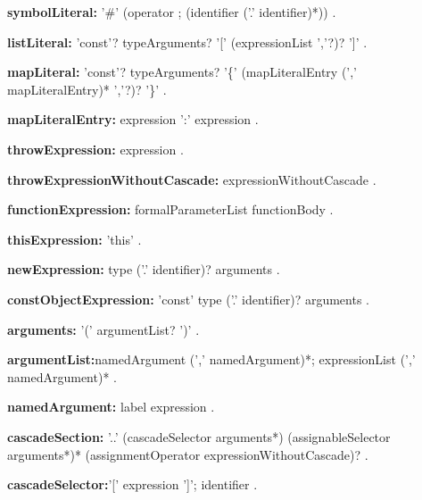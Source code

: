 \begin{grammar}
{\bf symbolLiteral:}
      '\#'  (operator ; (identifier ('.' identifier)*))  .
\end{grammar}
\begin{grammar}
{\bf listLiteral:}
     'const'? typeArguments? '[' (expressionList ','?)? ']'
    .
\end{grammar}
\begin{grammar}
{\bf mapLiteral:}
      'const'?  typeArguments? '\{' (mapLiteralEntry (',' mapLiteralEntry)* ','?)? '\}'
    .

{\bf mapLiteralEntry:}
  expression ':' expression 
    .
\end{grammar}
\begin{grammar}
{\bf throwExpression:}
     \THROW{} expression 
    .
    
   {\bf throwExpressionWithoutCascade:}
     \THROW{} expressionWithoutCascade 
    .
 
 \end{grammar}
\begin{grammar}
{\bf functionExpression:}
    formalParameterList functionBody
    .
 \end{grammar}
\begin{grammar}
{\bf thisExpression:}
      'this'
     .
\end{grammar}
\begin{grammar}
{\bf newExpression:}
\NEW{} type ('.' identifier)? arguments
.
\end{grammar}
\begin{grammar}
{\bf constObjectExpression:}
'const' type ('.' identifier)? arguments
.
\end{grammar}
\begin{grammar}
{\bf arguments:}
      '(' argumentList? ')'
    .

{\bf argumentList:}namedArgument (',' namedArgument)*;
      expressionList (',' namedArgument)*
    .

{\bf namedArgument:}
      label expression %
    .
 \end{grammar}
\begin{grammar}
{\bf cascadeSection:}
      '..' (cascadeSelector arguments*) (assignableSelector arguments*)* (assignmentOperator expressionWithoutCascade)?
      .
     
{\bf cascadeSelector:}'['  expression ']';
      identifier
      .
\end{grammar}
